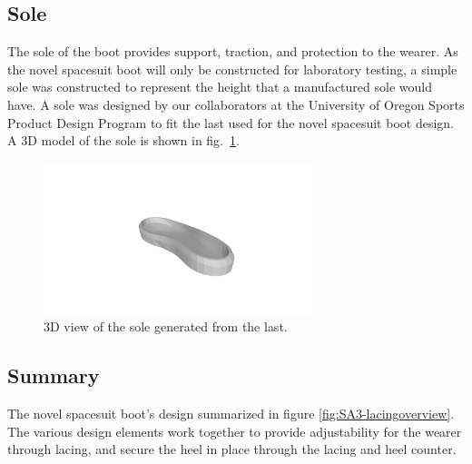 \documentclass[defaultstyle,11pt]{comps}
\begin{document}
\hypertarget{sole-1}{%
\subsection{Sole}\label{sole-1}}

The sole of the boot provides support, traction, and protection to the wearer.
As the novel spacesuit boot will only be constructed for laboratory testing, a simple sole was constructed to represent the height that a manufactured sole would have.
A sole was designed by our collaborators at the University of Oregon Sports Product Design Program to fit the last used for the novel spacesuit boot design.
A 3D model of the sole is shown in fig.~\ref{fig:SA3-solemold}.

\begin{figure}
\hypertarget{fig:SA3-solemold}{%
\centering
\includegraphics[width=0.7\textwidth,height=\textheight]{../fig/SA3/sole_3d.png}
\caption{3D view of the sole generated from the last.}\label{fig:SA3-solemold}
}
\end{figure}

\hypertarget{summary-4}{%
\subsection{Summary}\label{summary-4}}

The novel spacesuit boot's design summarized in figure \ref{fig:SA3-lacingoverview}.
The various design elements work together to provide adjustability for the wearer through lacing, and secure the heel in place through the lacing and heel counter.
\end{document}
